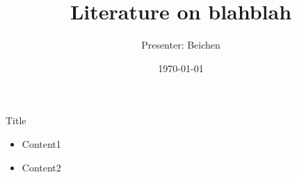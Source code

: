 \documentclass{beamer}
\title[For short]{Literature on blahblah}
\author{Presenter: Beichen}
\date{\today}
\begin{document}

\begin{frame}
  \titlepage
\end{frame}

\begin{frame}{Title}
\begin{itemize}
  \item Content1
  \item Content2
\end{itemize}
\end{frame}
\end{document}
